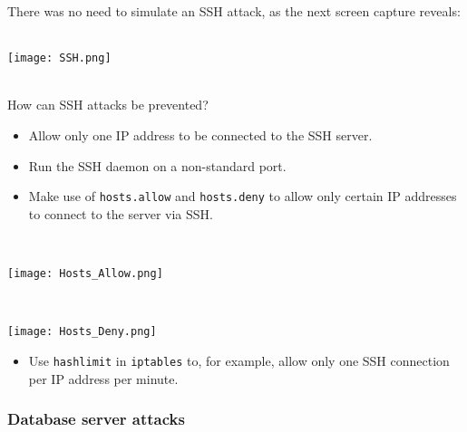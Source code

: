 There was no need to simulate an SSH attack, as the next screen capture reveals: \\ \\
\noindent\begin{minipage}{\textwidth}
    \centering
    \texttt{[image: SSH.png]}
\end{minipage}
$\;$ \\ \\
How can SSH attacks be prevented?
\begin{itemize}
\item Allow only one IP address to be connected to the SSH server.
\item Run the SSH daemon on a non-standard port.
\item Make use of \texttt{hosts.allow} and \texttt{hosts.deny} to allow only certain IP addresses to connect to the server via SSH.
\end{itemize}
$\;$ \\ \\
\noindent\begin{minipage}{\textwidth}
    \centering
    \texttt{[image: Hosts\_Allow.png]}
\end{minipage}
$\;$ \\ \\
\noindent\begin{minipage}{\textwidth}
    \centering
    \texttt{[image: Hosts\_Deny.png]}
\end{minipage}
\begin{itemize}
\item Use \texttt{hashlimit} in \texttt{iptables} to, for example, allow only one SSH connection per IP address per minute.
\end{itemize}

\subsubsection{Database server attacks}

